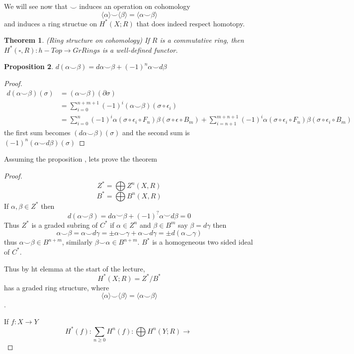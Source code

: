 \documentclass[11pt]{article}
\newtheorem{thm}{Theorem}[section]
\newtheorem{prop}[thm]{Proposition}
\newcommand{\pd}{\partial}
\newcommand{\lrta}{\longrightarrow}
\newcommand{\lgl}{\langle}
\newcommand{\rgl}{\rangle}
\begin{document}
We will see now that $\smile$ induces an operation on cohomology
$$
\lgl\alpha\rgl\smile\lgl\beta\rgl=\lgl\alpha\smile\beta\rgl
$$
and induces a ring structue on $H^*(X;R)$ that does indeed respect homotopy.


\begin{thm}(Ring structure on cohomology)
If $R$ is a commutative ring, then 
$H^*(\square, R): h-Top\lrta GrRings$ is a well-defined functor.
\end{thm}

\begin{prop}
$d(\alpha\smile\beta)=d\alpha\smile \beta+(-1)^n\alpha\smile d\beta$
\end{prop}
\begin{proof}
$$
\begin{aligned}
d(\alpha\smile \beta)(\sigma)&=(\alpha\smile\beta)(\pd\sigma)\\
&=\sum_{i=0}^{n+m+1}(-1)^i(\alpha\smile \beta)(\sigma\circ \epsilon_i)\\
&=\sum_{i=0}^{n}(-1)^i
\alpha(\sigma\circ \epsilon_i\circ F_n)\beta(\sigma\circ \epsilon\circ B_m)+\sum_{i=n+1}^{m+n+1}(-1)^i\alpha(\sigma\circ\epsilon_i\circ F_n)\beta(\sigma\circ \epsilon_i\circ B_m)
\end{aligned}
$$
the first sum becomes $(d\alpha\smile \beta)(\sigma)$ and the second sum is $(-1)^n(\alpha\smile d\beta)(\sigma)$
\end{proof}

Assuming the proposition , lets prove the theorem

\begin{proof}
$$
Z^*=\bigoplus Z^n(X,R)
$$
$$
B^*=\bigoplus B^n(X,R)
$$
If $\alpha,\beta\in Z^*$ then 
$$
d(\alpha\smile \beta)=d\alpha\smile \beta+(-1)^{?}\alpha\smile d\beta=0
$$
Thus $Z^*$ is a graded subring of $C^*$ if $\alpha\in Z^n$ and $\beta\in B^m$ say $\beta=d \gamma$
then
$$
\alpha\smile \beta=\alpha\smile d\gamma=\pm \alpha\smile \gamma+\alpha \smile d\gamma=\pm d(\alpha\smile \gamma)
$$
thus $\alpha\smile \beta\in B^{n+m}$, similarly $\beta\smile \alpha\in B^{n+m}$. $B^*$ is a homogeneous two sided ideal of $C^*$.

Thus by ht elemma at the start of the lecture,
$$
H^*(X;R)=Z^*/B^*
$$
has a graded ring structure, where
$$
\lgl\alpha\rgl\smile\lgl\beta\rgl=\lgl\alpha\smile\beta\rgl
$$.

If $f:X\lrta Y$
$$
H^*(f):\sum_{n\geq 0}H^n(f):\bigoplus H^n(Y;R)\lrta \
$$
\end{proof}
\end{document}
